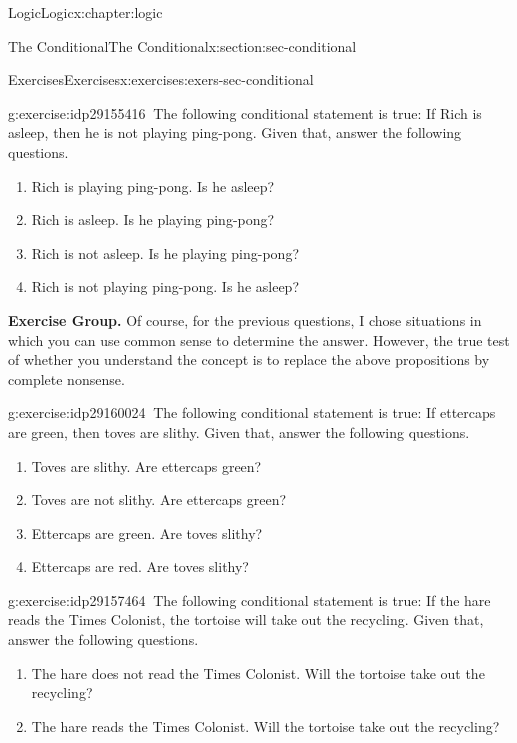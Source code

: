 \documentclass[twoside,10pt,]{book}
\numberwithin{equation}{section}
\begin{document}
\begin{chapterptx}{Logic}{}{Logic}{}{}{x:chapter:logic}
\begin{sectionptx}{The Conditional}{}{The Conditional}{}{}{x:section:sec-conditional}
\begin{exercises-subsection}{Exercises}{}{Exercises}{}{}{x:exercises:exers-sec-conditional}
\begin{divisionexercise}{20}{}{}{g:exercise:idp29155416}%
\(\ \)The following conditional statement is true: If Rich is asleep, then he is not playing ping-pong.  Given that, answer the following questions. %
\begin{enumerate}[label=(\alph*)]
\item{}Rich is playing ping-pong.  Is he asleep?%
\item{}Rich is asleep.  Is he playing ping-pong?%
\item{}Rich is not asleep.  Is he playing ping-pong?%
\item{}Rich is not playing ping-pong.  Is he asleep?%
\end{enumerate}
\end{divisionexercise}%
\par\medskip\noindent%
\textbf{Exercise Group.}\space\space%
Of course, for the previous questions, I chose situations in which you can use common sense to determine the answer.  However, the true test of whether you understand the concept is to replace the above propositions by complete nonsense.\begin{exercisegroup}
\begin{divisionexerciseeg}{21}{}{}{g:exercise:idp29160024}%
\(\ \)The following conditional statement is true: If ettercaps are green, then toves are slithy.  Given that, answer the following questions. %
\begin{enumerate}[label=(\alph*)]
\item{}Toves are slithy.  Are ettercaps green?%
\item{}Toves are not slithy.  Are ettercaps green?%
\item{}Ettercaps are green.  Are toves slithy?%
\item{}Ettercaps are red.  Are toves slithy?%
\end{enumerate}
\end{divisionexerciseeg}%
\begin{divisionexerciseeg}{22}{}{}{g:exercise:idp29157464}%
\(\ \)The following conditional statement is true: If the hare reads the Times Colonist, the tortoise will take out the recycling.  Given that, answer the following questions. %
\begin{enumerate}[label=(\alph*)]
\item{}The hare does not read the Times Colonist.  Will the tortoise take out the recycling?%
\item{}The hare reads the Times Colonist.  Will the tortoise take out the recycling?%

\end{enumerate}
\end{divisionexerciseeg}
\end{exercisegroup}
\end{exercises-subsection}
\end{sectionptx}
\end{chapterptx}
\end{document}
